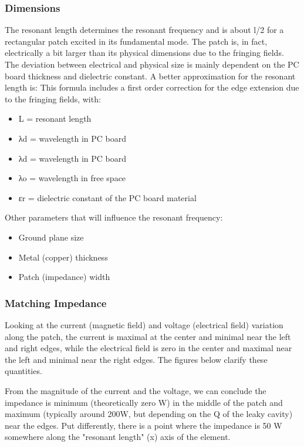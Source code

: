 \documentclass[12pt]{article}
\begin{document}
  \subsubsection{Dimensions}\label{sub:Dimensions}
   \justify
    The resonant length determines the resonant frequency and is about l/2 for a rectangular patch excited in its fundamental mode. The patch is, in fact, electrically a bit larger than its physical dimensions due to the fringing fields. The deviation between electrical and physical size is mainly dependent on the PC board thickness and dielectric constant.
    A better approximation for the resonant length is:
   \justify
    This formula includes a first order correction for the edge extension due to the fringing fields, with:
     \begin{itemize}
       \item   L = resonant length
       \item   λd = wavelength in PC board
       \item λd = wavelength in PC board
       \item λo = wavelength in free space
       \item εr = dielectric constant of the PC board material

     \end{itemize}

     Other parameters that will influence the resonant frequency:

     \begin{itemize}
       \item Ground plane size
       \item Metal (copper) thickness
       \item  Patch (impedance) width
     \end{itemize}

    \subsubsection{Matching Impedance}\label{subp:Matching Impedance}
     \justify
      Looking at the current (magnetic field) and voltage (electrical field) variation along the  patch, the current is maximal at the center and minimal near the left and right edges, while the electrical field is zero in the center and maximal near the left and minimal near the right edges.  The figures below clarify these quantities.

	 \justify
      From the magnitude of the current and the voltage, we can conclude the impedance is minimum (theoretically zero W) in the middle of the patch and maximum (typically around 200W, but depending on the Q of the leaky cavity) near the edges. Put differently, there is a point where the impedance is 50 W somewhere along the "resonant length" (x) axis of the element.
\end{document}
